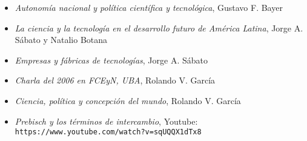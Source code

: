 \begin{itemize}
    \item \textit{Autonomía nacional y política científica y tecnológica}, Gustavo F. Bayer
    \item \textit{La ciencia y la tecnología en el desarrollo futuro de América Latina}, Jorge A. Sábato y Natalio Botana
    \item \textit{Empresas y fábricas de tecnologías}, Jorge A. Sábato
    \item \textit{Charla del 2006 en FCEyN, UBA}, Rolando V. García
    \item \textit{Ciencia, política y concepción del mundo}, Rolando V. García
    \item \textit{Prebisch y los términos de intercambio}, Youtube: \texttt{https://www.youtube.com/watch?v=sqUQQX1dTx8}
\end{itemize}
